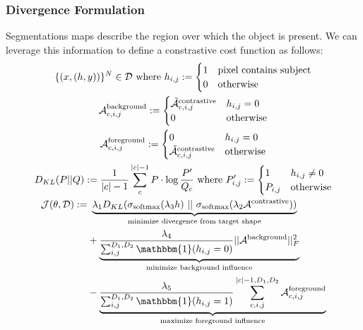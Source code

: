 \documentclass{article}
\begin{document}
\subsubsection{Divergence Formulation}
Segmentations maps describe the region over which the object is present. We can leverage this information to define a constrastive cost function as follows:
\begin{gather}
	\{(x, (h, y))\}^N \in \mathcal{D} \text{ where } h_{i,j} := \begin{cases}
		1 & \text{pixel contains subject} \\
		0 & \text{otherwise}
	\end{cases} \\
	\mathcal{\bm{A}}^{\text{background}}_{c,i,j} := \begin{cases}
		\tilde{\mathcal{\bm{A}}}^{\text{contrastive}}_{c,i,j} & h_{i,j} = 0 \\
		0 & \text{otherwise}
	\end{cases} \\
	\mathcal{\bm{A}}^{\text{foreground}}_{c,i,j} := \begin{cases}
		0 & h_{i,j} = 0 \\
		\tilde{\mathcal{\bm{A}}}^{\text{contrastive}}_{c,i,j} & \text{otherwise}
	\end{cases} \\
	D_{KL}(P || Q) := \frac{1}{|c|-1}\sum^{|c|-1}_c P \cdot \log \frac{P'}{Q_c} \text{ where } 
	P'_{i,j} := \begin{cases}
		1 & h_{i,j} \neq 0 \\
		P_{i,j} & \text{otherwise}
	\end{cases} \label{d_kl} \\
	\begin{split}
		\mathcal{\bm{J}}(\theta, \mathcal{D}) := &\ \underbrace{\lambda_1 D_{KL}(\sigma_{\text{softmax}}(\lambda_3 h)\ ||\ \sigma_{\text{softmax}}(\lambda_2 \mathcal{\bm{A}}^{\text{contrastive}}))}_{\text{minimize divergence from target shape}} \\
		&+ \underbrace{\frac{\lambda_4}{\sum^{D_1,D_2}_{i,j}\mathbbm{1}(h_{i,j} = 0)} ||\mathcal{\bm{A}}^{\text{background}}||^2_F}_{\text{minimize background influence}} \\
		&- \underbrace{\frac{\lambda_5}{\sum^{D_1,D_2}_{i,j}\mathbbm{1}(h_{i,j} = 1)} \sum^{|c|-1,D_1,D_2}_{c,i,j} \mathcal{\bm{A}}^{\text{foreground}}_{c,i,j}}_{\text{maximize foreground influence}}
	\end{split}
\end{gather}
\end{document}
